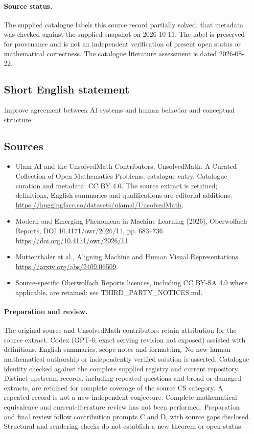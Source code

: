 \documentclass[11pt]{article}
\begin{document}
\paragraph{Source status.}
The supplied catalogue labels this source record partially solved; that metadata was checked against the supplied snapshot on 2026-10-11. The label is preserved for provenance and is not an independent verification of present open status or mathematical correctness. The catalogue literature assessment is dated 2026-08-22.
\subsection{Short English statement}
Improve agreement between AI systems and human behavior and conceptual structure.
\subsection{Sources}
\begin{itemize}
\item[S1] Ulam AI and the UnsolvedMath Contributors, UnsolvedMath: A Curated Collection of Open Mathematics Problems, catalogue entry. Catalogue curation and metadata: CC BY 4.0. The source extract is retained; definitions, English summaries and qualifications are editorial additions.
\url{https://huggingface.co/datasets/ulamai/UnsolvedMath}.
\item[S2] Modern and Emerging Phenomena in Machine Learning (2026), Oberwolfach Reports, DOI 10.4171/owr/2026/11, pp. 683--736
\url{https://doi.org/10.4171/owr/2026/11}.
\item[S3] Muttenthaler et al., Aligning Machine and Human Visual Representations
\url{https://arxiv.org/abs/2409.06509}.
\item Source-specific Oberwolfach Reports licences, including CC BY-SA 4.0 where applicable, are retained; see THIRD\_PARTY\_NOTICES.md.
\end{itemize}
\paragraph{Preparation and review.}
The original source and UnsolvedMath contributors retain attribution for the source extract. Codex (GPT-6; exact serving revision not exposed) assisted with definitions, English summaries, scope notes and formatting. No new human mathematical authorship or independently verified solution is asserted. Catalogue identity checked against the complete supplied registry and current repository. Distinct upstream records, including repeated questions and broad or damaged extracts, are retained for complete coverage of the source CS category. A repeated record is not a new independent conjecture. Complete mathematical-equivalence and current-literature review has not been performed. Preparation and final review follow contribution prompts C and D, with source gaps disclosed. Structural and rendering checks do not establish a new theorem or open status.
\label{end:statement}
\end{document}
